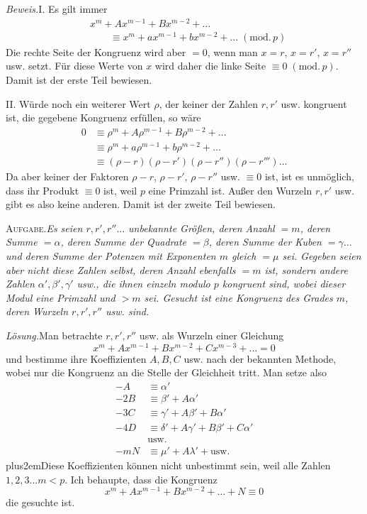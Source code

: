 \emph{Beweis.}\quad I. Es gilt immer
\[
\begin{aligned}
&x^m+Ax^{m-1}+Bx^{m-2}+\ldots\\
&\qquad\equiv x^m+ax^{m-1}+bx^{m-2}+\ldots\;(\mathrm{mod.}\,p)
\end{aligned}
\]
Die rechte Seite der Kongruenz wird aber $=0$, wenn man $x=r$, $x=r'$, $x=r''$ usw. setzt. Für diese Werte von $x$ wird daher die linke Seite $\equiv0\;(\mathrm{mod.}\,p)$. Damit ist der erste Teil bewiesen.

II. Würde noch ein weiterer Wert $\rho$, der keiner der Zahlen $r,r'$ usw. kongruent ist, die gegebene Kongruenz erfüllen, so wäre
\[
\begin{aligned}
0&\equiv\rho^m+A\rho^{m-1}+B\rho^{m-2}+\ldots\\
&\equiv\rho^m+a\rho^{m-1}+b\rho^{m-2}+\ldots\\
&\equiv(\rho-r)(\rho-r')(\rho-r'')(\rho-r''')\ldots
\end{aligned}
\]
Da aber keiner der Faktoren $\rho-r$, $\rho-r'$, $\rho-r''$ usw. $\equiv0$ ist, ist es unmöglich, dass ihr Produkt $\equiv0$ ist, weil $p$ eine Primzahl ist. Außer den Wurzeln $r,r'$ usw. gibt es also keine anderen. Damit ist der zweite Teil bewiesen.

\textsc{Aufgabe.}\quad\emph{Es seien $r,r',r''\ldots$ unbekannte Größen, deren Anzahl $=m$, deren Summe $=\alpha$, deren Summe der Quadrate $=\beta$, deren Summe der Kuben $=\gamma\ldots$ und deren Summe der Potenzen mit Exponenten $m$ gleich $=\mu$ sei. Gegeben seien aber nicht diese Zahlen selbst, deren Anzahl ebenfalls $=m$ ist, sondern andere Zahlen $\alpha',\beta',\gamma'$ usw., die ihnen einzeln modulo $p$ kongruent sind, wobei dieser Modul eine Primzahl und $>m$ sei. Gesucht ist eine Kongruenz des Grades $m$, deren Wurzeln $r,r',r''$ usw. sind.}

\emph{Lösung.}\quad Man betrachte $r,r',r''$ usw. als Wurzeln einer Gleichung
\[
x^m+Ax^{m-1}+Bx^{m-2}+Cx^{m-3}+\ldots=0
\]
und bestimme ihre Koeffizienten $A,B,C$ usw. nach der bekannten Methode, wobei nur die Kongruenz an die Stelle der Gleichheit tritt. Man setze also
\[
\begin{aligned}
-A&\equiv\alpha'\\
-2B&\equiv\beta'+A\alpha'\\
-3C&\equiv\gamma'+A\beta'+B\alpha'\\
-4D&\equiv\delta'+A\gamma'+B\beta'+C\alpha'\\
&\text{usw.}\\
-mN&\equiv\mu'+A\lambda'+\text{usw.}
\end{aligned}
\]
\begingroup\rightskip=0pt plus2em\relax Diese Koeffizienten können nicht unbestimmt sein, weil alle Zahlen \mbox{$1,2,3\ldots m<p$}. Ich behaupte, dass die Kongruenz
\[
x^m+Ax^{m-1}+Bx^{m-2}+\ldots+N\equiv0
\]
die gesuchte ist.\par\endgroup


